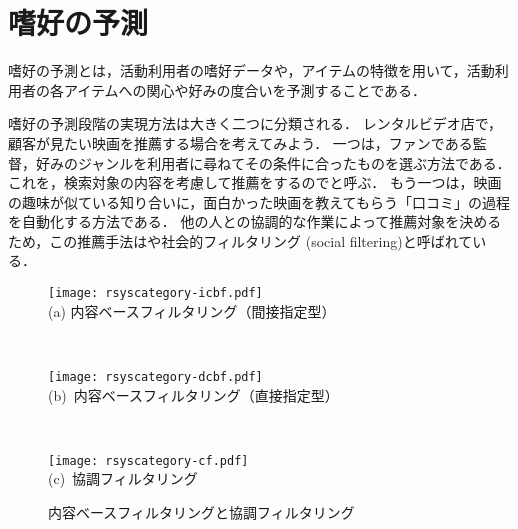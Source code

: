 \chapter{嗜好の予測}
\label{chap:process}

嗜好の予測とは，活動利用者の嗜好データや，アイテムの特徴を用いて，活動利用者の各アイテムへの関心や好みの度合いを予測することである．

嗜好の予測段階の実現方法は大きく二つに分類される．
レンタルビデオ店で，顧客が見たい映画を推薦する場合を考えてみよう．
一つは，ファンである監督，好みのジャンルを利用者に尋ねてその条件に合ったものを選ぶ方法である．
これを，検索対象の内容を考慮して推薦をするのでと呼ぶ．
もう一つは，映画の趣味が似ている知り合いに，面白かった映画を教えてもらう「口コミ」の過程を自動化する方法である．
他の人との協調的な作業によって推薦対象を決めるため，この推薦手法はや社会的フィルタリング (social filtering)と呼ばれている．

\begin{figure}
\centering
\begin{minipage}{0.6\fullwidth}
\centering
\texttt{[image: rsyscategory-icbf.pdf]}\\
 (a) 内容ベースフィルタリング（間接指定型）
\end{minipage}\\\medskip
\begin{minipage}{0.6\fullwidth}
\centering
\texttt{[image: rsyscategory-dcbf.pdf]}\\
 (b)~内容ベースフィルタリング（直接指定型）
\end{minipage}\\\medskip
\begin{minipage}{0.6\fullwidth}
\centering
\texttt{[image: rsyscategory-cf.pdf]}\\
 (c)~協調フィルタリング
\end{minipage}
\caption{内容ベースフィルタリングと協調フィルタリング}
\label{fig:cfcbf}
\end{figure}


